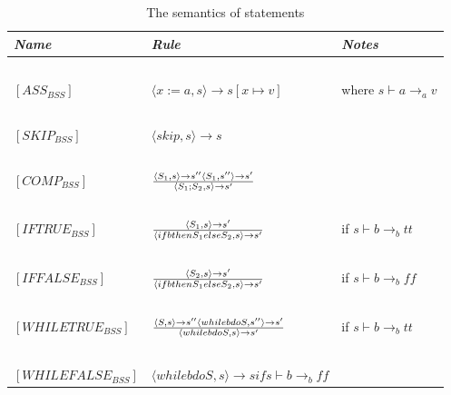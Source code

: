 \begin{table}[H]
	\begin{tabular}{|l|l|l|}
	\hline
	\emph{Name}			& \emph{Rule}																															& \emph{Notes} \\ \hline
			~			&															~																			& ~ \\
	$[ASS_{BSS}]$		& $\langle x := a,s \rangle \rightarrow s[x \mapsto v]$																					& where $s \vdash a \rightarrow_{a} v$ \\
			~			&															~																			& ~ \\
	$[SKIP_{BSS}]$		& $\langle skip, s \rangle \rightarrow s$																								& ~ \\
			~			&															~																			& ~ \\
	$[COMP_{BSS}]$		& $\langle S_{1},s \rangle \rightarrow s''  \langle S_{1},s'' \rangle \rightarrow s'  \over \langle S_{1};S_{2},s \rangle \rightarrow s'$	& ~ \\
			~			&															~																			& ~ \\
	$[IFTRUE_{BSS}]$	& $\langle S_{1},s \rangle \rightarrow s' \over \langle if b then S_{1} else S_{2},s \rangle \rightarrow s'	$							& if $s \vdash b \rightarrow_{b} tt$\\
			~			&															~																			& ~ \\
	$[IFFALSE_{BSS}]$	& $\langle S_{2},s \rangle \rightarrow s' \over \langle if b then S_{1} else S_{2},s \rangle \rightarrow s'	$							& if $s \vdash b \rightarrow_{b} ff$\\
			~			&															~																			& ~ \\
	$[WHILETRUE_{BSS}]$	& $\langle S,s \rangle \rightarrow s'' \langle while b do S,s'' \rangle \rightarrow s' \over \langle while b do S,s \rangle \rightarrow s'	$ & if $s \vdash b \rightarrow_{b} tt$\\
			~			&															~																			& ~ \\
	$[WHILEFALSE_{BSS}]$& $\langle while b do S,s \rangle \rightarrow s if s \vdash b \rightarrow_{b} ff $														& ~ \\
	\hline
	\end{tabular}
	\label{tab:semantics_statements}
	\caption{The semantics of statements}
\end{table}